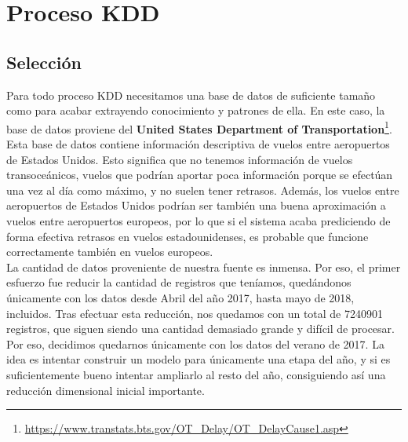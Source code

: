 \documentclass[format=acmsmall, review=false, screen=true]{acmart}
\begin{document}
\section{Proceso KDD}
\subsection{Selección}
Para todo proceso KDD necesitamos una base de datos de suficiente tamaño como para acabar extrayendo conocimiento y patrones de ella. En este caso, la base de datos proviene del \textbf{United States Department of Transportation}\footnote{\href{United States Department of Transportation}{https://www.transtats.bts.gov/OT\_Delay/OT\_DelayCause1.asp}}. Esta base de datos contiene información descriptiva de vuelos entre aeropuertos de Estados Unidos. Esto significa que no tenemos información de vuelos transoceánicos, vuelos que podrían aportar poca información porque se efectúan una vez al día como máximo, y no suelen tener retrasos. Además, los vuelos entre aeropuertos de Estados Unidos podrían ser también una buena aproximación a vuelos entre aeropuertos europeos, por lo que si el sistema acaba prediciendo de forma efectiva retrasos en vuelos estadounidenses, es probable que funcione correctamente también en vuelos europeos. \\

La cantidad de datos proveniente de nuestra fuente es inmensa. Por eso, el primer esfuerzo fue reducir la cantidad de registros que teníamos, quedándonos únicamente con los datos desde Abril del año 2017, hasta mayo de 2018, incluidos. Tras efectuar esta reducción, nos quedamos con un total de 7240901 registros, que siguen siendo una cantidad demasiado grande y difícil de procesar. Por eso, decidimos quedarnos únicamente con los datos del verano de 2017. La idea es intentar construir un modelo para únicamente una etapa del año, y si es suficientemente bueno intentar ampliarlo al resto del año, consiguiendo así una reducción dimensional inicial importante. \\
\end{document}
